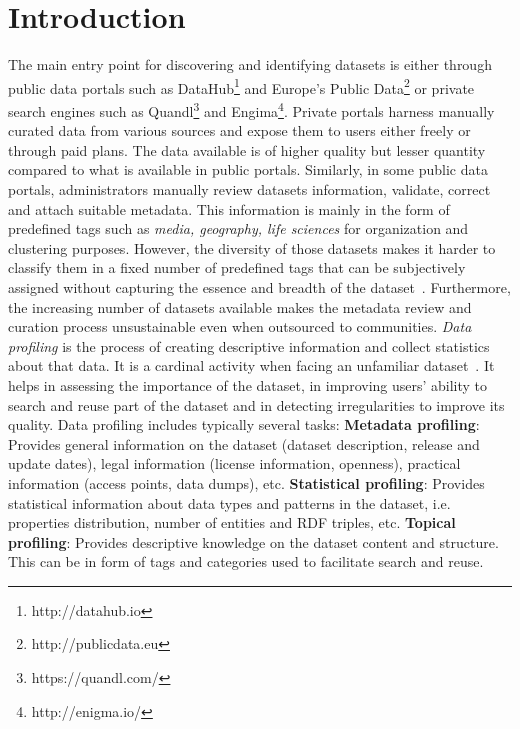 \documentclass{sig-alternate}
\begin{document}

\section{Introduction}
The main entry point for discovering and identifying datasets is either through public data portals such as DataHub\footnote{http://datahub.io} and Europe's Public Data\footnote{http://publicdata.eu} or private search engines such as Quandl\footnote{https://quandl.com/} and Engima\footnote{http://enigma.io/}. Private portals harness manually curated data from various sources and expose them to users either freely or through paid plans. The data available is of higher quality but lesser quantity compared to what is available in public portals. Similarly, in some public data portals, administrators manually review datasets information, validate, correct and attach suitable metadata. This information is mainly in the form of predefined tags such as \textit{media, geography, life sciences} for organization and clustering purposes. However, the diversity of those datasets makes it harder to classify them in a fixed number of predefined tags that can be subjectively assigned without capturing the essence and breadth of the dataset~\cite{6690016}. Furthermore, the increasing number of datasets available makes the metadata review and curation process unsustainable even when outsourced to communities.
\textit{Data profiling} is the process of creating descriptive information and collect statistics about that data. It is a cardinal activity when facing an unfamiliar dataset~\cite{semwebprofiling}. It helps in assessing the importance of the dataset, in improving users' ability to search and reuse part of the dataset and in detecting irregularities to improve its quality. Data profiling includes typically several tasks:
\textbf{Metadata profiling}: Provides general information on the dataset (dataset description, release and update dates), legal information (license information, openness), practical information (access points, data dumps), etc. \textbf{Statistical profiling}: Provides statistical information about data types and patterns in the dataset, i.e. properties distribution, number of entities and RDF triples, etc. \textbf{Topical profiling}: Provides descriptive knowledge on the dataset content and structure. This can be in form of tags and categories used to facilitate search and reuse.
\end{document}
